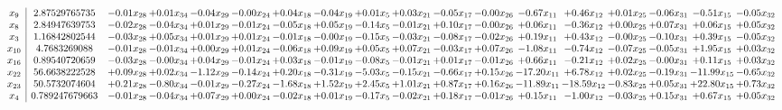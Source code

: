 \documentclass[9pt]{article}
\begin{document}
 \[\begin{array}{c| c c@{\hskip 2pt} c@{\hskip 2pt} c@{\hskip 2pt} c@{\hskip 2pt} c@{\hskip 2pt} c@{\hskip 2pt} c@{\hskip 2pt} c@{\hskip 2pt} c@{\hskip 2pt} c@{\hskip 2pt} c@{\hskip 2pt} c@{\hskip 2pt} c@{\hskip 2pt} c@{\hskip 2pt} c@{\hskip 2pt} c@{\hskip 2pt} }
 x_{9}   &  2.87529765735 & -0.01 x_{28} & +  0.01 x_{34} & -0.04 x_{29} & -0.00 x_{24} & +  0.04 x_{18} & -0.04 x_{19} & +  0.01 x_{5} & +  0.03 x_{21} & -0.05 x_{17} & -0.00 x_{26} & -0.67 x_{11} & +  0.46 x_{12} & +  0.01 x_{25} & -0.06 x_{31} & -0.51 x_{15} & -0.05 x_{32}\\
 x_{8}   &  2.84947639753 & -0.02 x_{28} & -0.04 x_{34} & +  0.01 x_{29} & -0.01 x_{24} & -0.05 x_{18} & +  0.05 x_{19} & -0.14 x_{5} & -0.01 x_{21} & +  0.10 x_{17} & -0.00 x_{26} & +  0.06 x_{11} & -0.36 x_{12} & +  0.00 x_{25} & +  0.07 x_{31} & +  0.06 x_{15} & +  0.05 x_{32}\\
 x_{3}   &  1.16842802544 & -0.03 x_{28} & +  0.05 x_{34} & +  0.01 x_{29} & +  0.01 x_{24} & -0.01 x_{18} & -0.00 x_{19} & -0.15 x_{5} & -0.03 x_{21} & -0.08 x_{17} & -0.02 x_{26} & +  0.19 x_{11} & +  0.43 x_{12} & -0.00 x_{25} & -0.10 x_{31} & +  0.39 x_{15} & -0.05 x_{32}\\
 x_{10}   &  4.7683269088 & -0.01 x_{28} & -0.01 x_{34} & +  0.00 x_{29} & +  0.01 x_{24} & -0.06 x_{18} & +  0.09 x_{19} & +  0.05 x_{5} & +  0.07 x_{21} & -0.03 x_{17} & +  0.07 x_{26} & -1.08 x_{11} & -0.74 x_{12} & -0.07 x_{25} & -0.05 x_{31} & +  1.95 x_{15} & +  0.03 x_{32}\\
 x_{16}   &  0.89540720659 & -0.03 x_{28} & -0.00 x_{34} & +  0.04 x_{29} & -0.01 x_{24} & +  0.03 x_{18} & -0.01 x_{19} & -0.08 x_{5} & -0.01 x_{21} & +  0.01 x_{17} & -0.01 x_{26} & +  0.66 x_{11} & -0.21 x_{12} & +  0.02 x_{25} & -0.00 x_{31} & +  0.11 x_{15} & +  0.03 x_{32}\\
 x_{22}   &  56.6638222528 & +  0.09 x_{28} & +  0.02 x_{34} & -1.12 x_{29} & -0.14 x_{24} & +  0.20 x_{18} & -0.31 x_{19} & -5.03 x_{5} & -0.15 x_{21} & -0.66 x_{17} & +  0.15 x_{26} & -17.20 x_{11} & +  6.78 x_{12} & +  0.02 x_{25} & -0.19 x_{31} & -11.99 x_{15} & -0.65 x_{32}\\
 x_{23}   &  50.5732074604 & +  0.21 x_{28} & -0.80 x_{34} & -0.01 x_{29} & -0.27 x_{24} & -1.68 x_{18} & +  1.52 x_{19} & +  2.45 x_{5} & +  1.01 x_{21} & +  0.87 x_{17} & +  0.16 x_{26} & -11.89 x_{11} & -18.59 x_{12} & -0.83 x_{25} & +  0.05 x_{31} & + 22.80 x_{15} & +  0.73 x_{32}\\
 x_{4}   &  0.789247679663 & -0.01 x_{28} & -0.04 x_{34} & +  0.07 x_{29} & +  0.00 x_{24} & -0.02 x_{18} & +  0.01 x_{19} & -0.17 x_{5} & -0.02 x_{21} & +  0.18 x_{17} & -0.01 x_{26} & +  0.15 x_{11} & -1.00 x_{12} & -0.03 x_{25} & +  0.15 x_{31} & +  0.67 x_{15} & +  0.05 x_{32}\\

\end{array}\]
\end{document}
